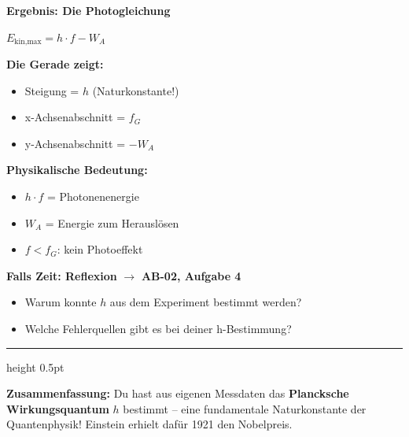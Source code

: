\documentclass[11pt,a4paper]{article}
\begin{document}
\begin{tcolorbox}[ergebnisbox]
\textbf{Ergebnis: Die Photogleichung}

\vspace{0.3em}
\begin{center}
{\Large $\boxed{E_{\text{kin,max}} = h \cdot f - W_A}$}
\end{center}

\vspace{0.3em}
\begin{minipage}[t]{0.48\textwidth}
\textbf{Die Gerade zeigt:}
\begin{itemize}[nosep]
\item Steigung = $h$ (Naturkonstante!)
\item x-Achsenabschnitt = $f_G$
\item y-Achsenabschnitt = $-W_A$
\end{itemize}
\end{minipage}
\hfill
\begin{minipage}[t]{0.48\textwidth}
\textbf{Physikalische Bedeutung:}
\begin{itemize}[nosep]
\item $h \cdot f$ = Photonenenergie
\item $W_A$ = Energie zum Herauslösen
\item $f < f_G$: kein Photoeffekt
\end{itemize}
\end{minipage}
\end{tcolorbox}

\vspace{0.5em}


\textbf{Falls Zeit: Reflexion} $\rightarrow$ \textbf{AB-02, Aufgabe 4}

\begin{itemize}[nosep]
\item Warum konnte $h$ aus dem Experiment bestimmt werden?
\item Welche Fehlerquellen gibt es bei deiner h-Bestimmung?
\end{itemize}

\vspace{0.3em}
\hrule height 0.5pt
\vspace{0.3em}

{\small\textbf{Zusammenfassung:} Du hast aus eigenen Messdaten das \textbf{Plancksche Wirkungsquantum} $h$ bestimmt -- eine fundamentale Naturkonstante der Quantenphysik! Einstein erhielt dafür 1921 den Nobelpreis.}
\end{document}
